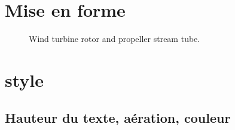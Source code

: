 \section{Mise en forme}








\begin{figure}[h]
  \begin{center}
  
  \caption{ Wind turbine rotor and propeller stream tube.}
  \label{fig:configs}
  \end{center}
\end{figure}



 



\section{style}


\subsection{Hauteur du texte, aération, couleur}

